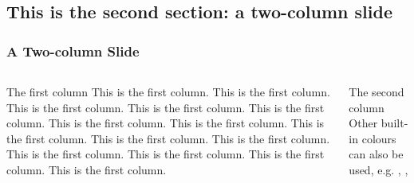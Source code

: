 \documentclass[10pt]{beamer}
\begin{document}
\begin{CJK*}{UTF8}{gbsn}
\section{This is the second section: a two-column slide}
\begin{frame}
\frametitle{A Two-column Slide}
\begin{columns} 
\begin{column}{0.5\textwidth} 
\begin{block}{The first column}
This is the first column.
This is the first column.
This is the first column.
This is the first column.
This is the first column.
This is the first column.
This is the first column.
This is the first column.
This is the first column.
This is the first column.
This is the first column.
This is the first column.
This is the first column.
This is the first column.
\end{block}
\end{column}
\begin{column}{0.5\textwidth} 
\begin{block}{The second column}
{\color{coreBlue}{This is the only ``Beihang colour'' I found. }} Other built-in colours can also be used, e.g. {\color{red}{red}}, {\color{orange}{orange}}, {\color{blue}{blue}}
\vspace{9.5em}
\end{block}
\end{column}
\end{columns}
\end{frame}

\end{CJK*}
\end{document}
